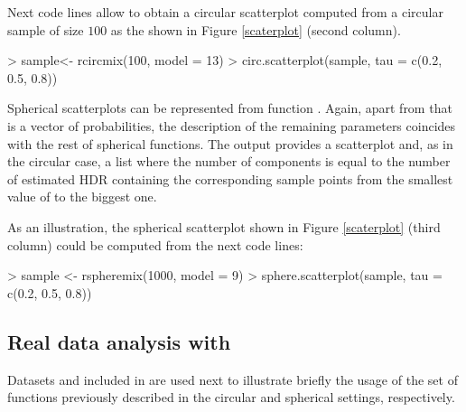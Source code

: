 Next code lines allow to obtain a circular scatterplot computed from a circular sample of size $100$ as the shown in Figure \ref{scaterplot} (second column).
\begin{example}
> sample<- rcircmix(100, model = 13)
> circ.scatterplot(sample, tau = c(0.2, 0.5, 0.8))
\end{example}

Spherical scatterplots can be represented from function . Again, apart from  that is a vector of probabilities, the description of the remaining parameters coincides with the rest of spherical functions. The output provides a scatterplot  and, as in the circular case, a list where the number of components is equal to the number of estimated HDR containing the corresponding sample points from the smallest value of  to the biggest one.

As an illustration, the spherical scatterplot shown in Figure \ref{scaterplot} (third column) could be computed from the next code lines: 
\begin{example}
> sample <- rspheremix(1000, model = 9) 
> sphere.scatterplot(sample, tau = c(0.2, 0.5, 0.8))
\end{example}



\subsection{Real data analysis with }\label{exploratorydatasets}


Datasets  and  included in  are used next to illustrate briefly the usage of the set of functions previously described in the circular and spherical settings, respectively.


